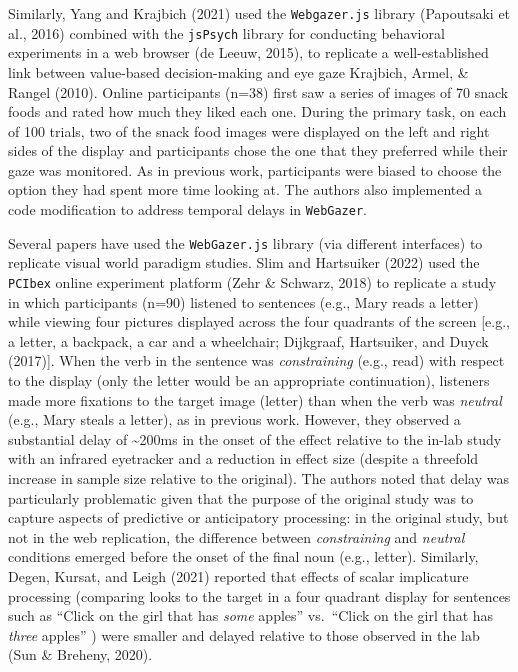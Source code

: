 \documentclass[
  man,floatsintext]{apa6}
\begin{document}
Similarly, Yang and Krajbich (2021) used the \texttt{Webgazer.js} library (Papoutsaki et al., 2016) combined with the \texttt{jsPsych} library for conducting behavioral experiments in a web browser (de Leeuw, 2015), to replicate a well-established link between value-based decision-making and eye gaze Krajbich, Armel, \& Rangel (2010). Online participants (n=38) first saw a series of images of 70 snack foods and rated how much they liked each one. During the primary task, on each of 100 trials, two of the snack food images were displayed on the left and right sides of the display and participants chose the one that they preferred while their gaze was monitored. As in previous work, participants were biased to choose the option they had spent more time looking at. The authors also implemented a code modification to address temporal delays in \texttt{WebGazer}.

Several papers have used the \texttt{WebGazer.js} library (via different interfaces) to replicate visual world paradigm studies. Slim and Hartsuiker (2022) used the \texttt{PCIbex} online experiment platform (Zehr \& Schwarz, 2018) to replicate a study in which participants (n=90) listened to sentences (e.g., Mary reads a letter) while viewing four pictures displayed across the four quadrants of the screen {[}e.g., a letter, a backpack, a car and a wheelchair; Dijkgraaf, Hartsuiker, and Duyck (2017){]}. When the verb in the sentence was \emph{constraining} (e.g., read) with respect to the display (only the letter would be an appropriate continuation), listeners made more fixations to the target image (letter) than when the verb was \emph{neutral} (e.g., Mary steals a letter), as in previous work. However, they observed a substantial delay of \textasciitilde200ms in the onset of the effect relative to the in-lab study with an infrared eyetracker and a reduction in effect size (despite a threefold increase in sample size relative to the original). The authors noted that delay was particularly problematic given that the purpose of the original study was to capture aspects of predictive or anticipatory processing: in the original study, but not in the web replication, the difference between \emph{constraining} and \emph{neutral} conditions emerged before the onset of the final noun (e.g., letter). Similarly, Degen, Kursat, and Leigh (2021) reported that effects of scalar implicature processing (comparing looks to the target in a four quadrant display for sentences such as ``Click on the girl that has \emph{some} apples'' vs.~``Click on the girl that has \emph{three} apples'' ) were smaller and delayed relative to those observed in the lab (Sun \& Breheny, 2020).
\end{document}

